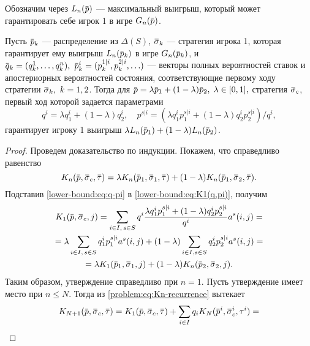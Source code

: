 {Обозначим через $\Low[n](\p)$ --- максимальный выигрыш, который может
гарантировать себе игрок 1 в игре $\theGame(\p)$.
\begin{lemma}
  \label{lower-bound:lemma:convex-combination}
  Пусть $\p_k$ --- распределение из $\Delta(S)$, $\sigmav_k$ --- стратегия
  игрока 1, которая гарантирует ему выигрыш $\Low[n](\p_k)$ в игре $\theGame[n](\p_k)$,
  и $\q_k = (q^1_k, \ldots, q^n_k),\ \p^i_k = ( p^{1|i}_k, p^{2|i}_k, \ldots)$
  --- векторы полных вероятностей ставок и апостериорных вероятностей состояния,
  соответствующие первому ходу стратегии $\sigmav_k,\ k = 1,2$. Тогда для $\p =
  \lambda \p_1 + (1-\lambda) \p_2, \; \lambda \in [0, 1],$ стратегия
  $\sigmav_c$, первый ход которой задается параметрами
  \begin{equation}
    \label{lower-bound:eq:q-pi}
    q^i = \lambda q^i_1 + (1-\lambda) q^i_2, \quad
    p^{s|i} = \left(\lambda q^i_1 p^{s|i}_1 + (1-\lambda) q^i_2 p^{s|i}_2\right)/q^i,
  \end{equation}
  гарантирует игроку 1 выигрыш $\lambda \Low[n](\p_1) + (1-\lambda)
  \Low[n](\p_2)$.
\end{lemma}
\begin{proof}
  Проведем доказательство по индукции. Покажем, что справедливо равенство %
  \begin{equation}
    \label{lower-bound:lemma:convex-combination:eq:1}
    \K[n](\p, \sigmav_c, \tauv) =
    \lambda \K[n](\p_1, \sigmav_1, \tauv) +
    (1-\lambda)\K[n](\p_1, \sigmav_2, \tauv).
  \end{equation}
  Подставив \eqref{lower-bound:eq:q-pi} в
  \eqref{lower-bound:eq:K1(q,pi)}, получим
  \begin{gather*}
    \K[1](\p, \sigmav_c, j) = \sum_{i \in I, \, s \in S}
    q^i \frac{\lambda q^i_1 p^{s|i}_1 + (1-\lambda) q^i_2 p^{s|i}_2}{q^i} a^s(i,j) = \\
    = \lambda \sum_{i \in I, \, s \in S} q^i_1 p^{s|i}_1 a^s(i,j) +
    (1-\lambda) \sum_{i \in I, s \in S} q^i_2 p^{s|i}_2 a^s(i, j) = \\
    = \lambda \K[1](\p_1, \sigmav_1, j) +
    (1-\lambda)\K(\p_2, \sigmav_2, j).
  \end{gather*}
  Таким образом, утверждение справедливо при $n = 1$. Пусть утверждение имеет
  место при $n \leqslant N$. Тогда из \eqref{problem:eq:Kn-recurrence} вытекает
  \begin{gather*}
    \K[N+1](\p, \sigmav_c, \tauv) =
    \K[1](\p, \sigmav_c, \tauv) +
    \sum_{i \in I} q_i \K[N](\p^i, \sigmav^i_c, \tau^i) = \\

\end{gather*}
\end{proof}}
